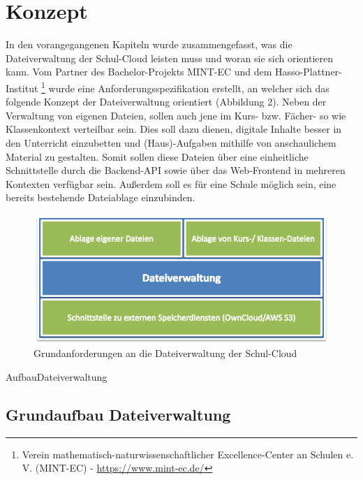 \section{Konzept}
\label{sec:concept}

In den vorangegangenen Kapiteln wurde zusammengefasst, was die Dateiverwaltung der Schul-Cloud leisten muss und woran sie sich orientieren kann. Vom Partner des Bachelor-Projekts MINT-EC und dem Hasso-Plattner-Institut \footnote{Verein mathematisch-naturwissenschaftlicher Excellence-Center an Schulen e. V. (MINT-EC) - \url{https://www.mint-ec.de/}} wurde eine Anforderungsspezifikation erstellt, an welcher sich das folgende Konzept der Dateiverwaltung orientiert (Abbildung 2). Neben der Verwaltung von eigenen Dateien, sollen auch  jene im Kurs- bzw. Fächer- so wie Klassenkontext verteilbar sein. Dies soll dazu dienen, digitale Inhalte besser in den Unterricht einzubetten und (Haus)-Aufgaben mithilfe von anschaulichem Material zu gestalten. Somit sollen diese Dateien über eine einheitliche Schnittstelle durch die Backend-API sowie über das Web-Frontend in mehreren Kontexten verfügbar sein. Außerdem soll es für eine Schule möglich sein, eine bereits bestehende Dateiablage einzubinden. 

\begin{figure}[H]
	\centering
	\includegraphics[width=0.8\linewidth]{images/AnforderungenDateiverwaltung}
	\caption[Caption for concept]{Grundanforderungen an die Dateiverwaltung der Schul-Cloud\footnotemark}
\end{figure}

AufbauDateiverwaltung

\subsection{Grundaufbau Dateiverwaltung}

